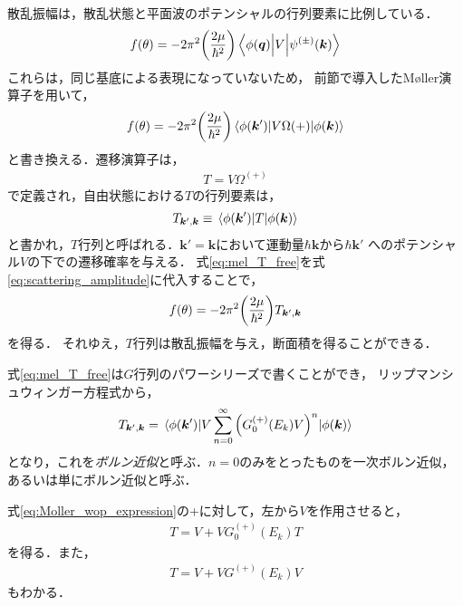 \documentclass[a4paper,11pt]{ltjsarticle}
\begin{document}
散乱振幅は，散乱状態と平面波のポテンシャルの行列要素に比例している．
\begin{align}\label{eq:scattering_amplitude}
  f(\theta) = -2\pi^2 \qty(\frac{2\mu}{\hbar^2}) \mel{\phi(\bm{q})}{V}{\psi^{(\pm)}(\bm{k})}
\end{align}
これらは，同じ基底による表現になっていないため，
前節で導入したM\o ller演算子を用いて，
\begin{align}\label{eq:scattering_amplitude_moller}
  f(\theta) = -2\pi^2\qty(\frac{2\mu}{\hbar^2}) \mel{\phi(\bm{k}')}{V \Omega{(+)}}{\phi(\bm{k})}
\end{align}
と書き換える．遷移演算子は，
\begin{align}\label{eq:def_transition_operator}
  T = V \Omega^{(+)}
\end{align}
で定義され，自由状態における$T$の行列要素は，
\begin{align}\label{eq:mel_T_free}
  T_{\bm{k}', \bm{k}} \equiv \mel{\phi(\bm{k}')}{T}{\phi(\bm{k})}
\end{align}
と書かれ，$T$行列と呼ばれる．$\bm{k}' = \bm{k}$において運動量$\hbar \bm{k}$から$\hbar \bm{k}'$
へのポテンシャル$V$の下での遷移確率を与える．
式\ref{eq:mel_T_free}を式\ref{eq:scattering_amplitude}に代入することで，
\begin{align}\label{eq:scattering_amplitude_tmatrix}
  f(\theta) = -2\pi^2 \qty(\frac{2\mu}{\hbar^2}) T_{\bm{k}', \bm{k}}
\end{align}
を得る．
それゆえ，$T$行列は散乱振幅を与え，断面積を得ることができる．

式\ref{eq:mel_T_free}は$G$行列のパワーシリーズで書くことができ，
リップマンシュウィンガー方程式から，
\begin{align}\label{eq:tmatrix_power_series}
  T_{\bm{k}', \bm{k}} = \mel{\phi(\bm{k}')}{V\sum_{n=0}^{\infty} \qty(G_0^{(+)}(E_k)V)^n}{\phi(\bm{k})}
\end{align}
となり，これを\emph{ボルン近似}と呼ぶ．$n=0$のみをとったものを一次ボルン近似，
あるいは単にボルン近似と呼ぶ．

式\ref{eq:Moller_wop_expression}の+に対して，左から$V$を作用させると，
\begin{align}\label{eq:LS_for_t}
  T = V + V G_0^{(+)}(E_k)T
\end{align}
を得る．また，
\begin{align}\label{eq:LS_for_t_g}
  T = V + VG^{(+)}(E_k)V
\end{align}
もわかる．
\end{document}
